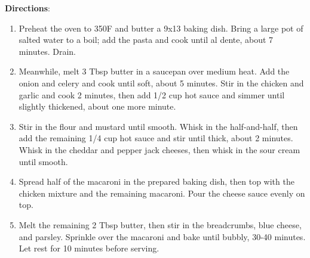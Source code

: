 \documentclass[11pt, twoside, openany]{book}
\begin{document}
\begin{minipage}[t]{\linewidth}
\textbf{Directions}:
\vspace{-3mm}\begin{enumerate}\setlength\itemsep{-1mm}
\item Preheat the oven to 350F and butter a 9x13 baking dish. Bring a large pot of salted water to a boil; add the pasta and cook until al dente, about 7 minutes. Drain.
\item Meanwhile, melt 3 Tbsp butter in a saucepan over medium heat. Add the onion and celery and cook until soft, about 5 minutes. Stir in the chicken and garlic and cook 2 minutes, then add 1/2 cup hot sauce and simmer until slightly thickened, about one more minute.
\item Stir in the flour and mustard until smooth. Whisk in the half-and-half, then add the remaining 1/4 cup hot sauce and stir until thick, about 2 minutes. Whisk in the cheddar and pepper jack cheeses, then whisk in the sour cream until smooth.
\item Spread half of the macaroni in the prepared baking dish, then top with the chicken mixture and the remaining macaroni. Pour the cheese sauce evenly on top.
\item Melt the remaining 2 Tbsp butter, then stir in the breadcrumbs, blue cheese, and parsley. Sprinkle over the macaroni and bake until bubbly, 30-40 minutes. Let rest for 10 minutes before serving.
\end{enumerate}
\end{minipage}\vspace{8mm}
\end{document}
